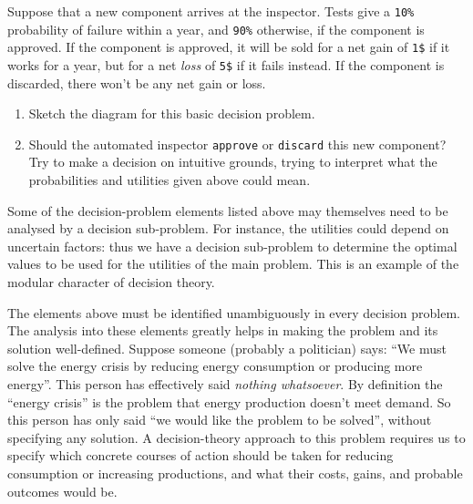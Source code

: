 \documentclass[
  a4paper,
  DIV=11,
  numbers=noendperiod,
  oneside]{scrreprt}
\begin{document}
\begin{tcolorbox}[enhanced jigsaw, arc=.35mm, colback=white, bottomrule=.15mm, bottomtitle=1mm, breakable, opacityback=0, toptitle=1mm, toprule=.15mm, rightrule=.15mm, colframe=quarto-callout-caution-color-frame, leftrule=.75mm, left=2mm, opacitybacktitle=0.6, titlerule=0mm, colbacktitle=quarto-callout-caution-color!10!white, title={Exercise}, coltitle=black]

Suppose that a new component arrives at the inspector. Tests give a
\texttt{10\%} probability of failure within a year, and \texttt{90\%}
otherwise, if the component is approved. If the component is approved,
it will be sold for a net gain of \texttt{1\$} if it works for a year,
but for a net \emph{loss} of \texttt{5\$} if it fails instead. If the
component is discarded, there won't be any net gain or loss.

\begin{enumerate}
\def\labelenumi{\arabic{enumi}.}
\item
  Sketch the diagram for this basic decision problem.
\item
  Should the automated inspector \texttt{approve} or \texttt{discard}
  this new component? Try to make a decision on intuitive grounds,
  trying to interpret what the probabilities and utilities given above
  could mean.
\end{enumerate}

\end{tcolorbox}

Some of the decision-problem elements listed above may themselves need
to be analysed by a decision sub-problem. For instance, the utilities
could depend on uncertain factors: thus we have a decision sub-problem
to determine the optimal values to be used for the utilities of the main
problem. This is an example of the modular character of decision theory.

The elements above must be identified unambiguously in every decision
problem. The analysis into these elements greatly helps in making the
problem and its solution well-defined. Suppose someone (probably a
politician) says: ``We must solve the energy crisis by reducing energy
consumption or producing more energy''. This person has effectively said
\emph{nothing whatsoever}. By definition the ``energy crisis'' is the
problem that energy production doesn't meet demand. So this person has
only said ``we would like the problem to be solved'', without specifying
any solution. A decision-theory approach to this problem requires us to
specify which concrete courses of action should be taken for reducing
consumption or increasing productions, and what their costs, gains, and
probable outcomes would be.
\end{document}

